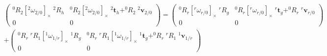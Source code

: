 \documentclass{article}
\newcommand\linvel{\mathbf{v}}
\newcommand\trans{\mathbf{t}}
\begin{document}
\begin{align*}
  \left(\begin{array}{ll}^0R_2[^2\omega_{2/0}]_{\times}\;^2R_h & ^0R_2[^2\omega_{2/0}]_{\times}\;^2\trans_h + ^0R_2\;^2\linvel_{2/0} \\ 0&0\end{array}\right) =
    \left(\begin{array}{ll}^0R_r[^r\omega_{r/0}]_{\times}\;^rR_g & ^0R_r[^r\omega_{r/0}]_{\times}\;^r\trans_g + ^0R_r\;^r\linvel_{r/0} \\ 0&0\end{array}\right) \\
      + \left(\begin{array}{ll}^0R_r\;^rR_1[^1\omega_{1/r}]_{\times}\;^1R_g &
        ^0R_r\;^rR_1[^1\omega_{1/r}]_{\times}\;^1\trans_g  + ^0R_r\;^rR_1\;^1\linvel_{1/r}\\ 0&0\end{array}\right)&
\end{align*}
\end{document}
